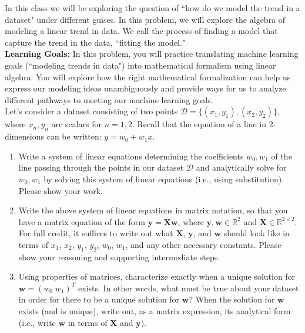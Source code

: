 \documentclass{harvardml}
\theoremstyle{definition}
\theoremstyle{plain}
\begin{document}
\begin{problem}
In this class we will be exploring the question of ``how do we model the trend in a dataset" under different guises. In this problem, we will explore the algebra of modeling a linear trend in data. We call the process of finding a model that capture the trend in the data, ``fitting the model."\\

\noindent \textbf{Learning Goals:} In this problem, you will practice translating machine learning goals (``modeling trends in data") into mathematical formalism using linear algebra. You will explore how the right mathematical formalization can help us express our modeling ideas unambiguously and provide ways for us to analyze different pathways to meeting our machine learning goals.\\

\noindent Let's consider a dataset consisting of two points $\mathcal{D} = \{(x_1, y_1), (x_2, y_2)\}$, where $x_n, y_n$ are scalars for $n=1, 2$. Recall that the equation of a line in 2-dimensions can be written: $y = w_0 + w_1x$. 
\begin{enumerate}
    \item Write a system of linear equations determining the coefficients $w_0, w_1$ of the line passing through the points in our dataset $\mathcal{D}$ and analytically solve for $w_0, w_1$ by solving this system of linear equations (i.e., using substitution). Please show your work.
    \item Write the above system of linear equations in matrix notation, so that you have a matrix equation of the form $\mathbf{y} = \mathbf{X}\mathbf{w}$, where $\mathbf{y}, \mathbf{w} \in \mathbb{R}^2$ and $\mathbf{X} \in \mathbb{R}^{2\times 2}$. For full credit, it suffices to write out what $\mathbf{X}$, $\mathbf{y}$, and $\mathbf{w}$ should look like in terms of $x_1$, $x_2$, $y_1$, $y_2$, $w_0$, $w_1$, and any other necessary constants. Please show your reasoning and supporting intermediate steps.
    \item Using properties of matrices, characterize exactly when a unique solution for $\mathbf{w}=\left(w_0 \; w_1 \right)^{T}$ exists. In other words, what must be true about your dataset in order for there to be a unique solution for $\mathbf{w}$? When the solution for $\mathbf{w}$ exists (and is unique), write out, as a matrix expression, its analytical form (i.e., write $\mathbf{w}$ in terms of $\mathbf{X}$ and $\mathbf{y}$).
    

\end{enumerate}
\end{problem}
\end{document}
